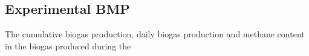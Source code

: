 \subsection{Experimental BMP}
The cumulative biogas production, daily biogas production and methane content in the biogas produced during the 